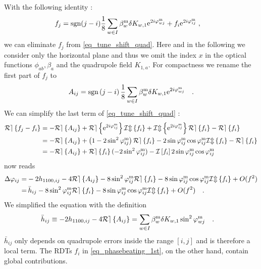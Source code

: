  With the following identity \cite{Tomas2005, Franchi2007}: 
\begin{align}
  f_j &= \text{sgn}(j-i) \frac{1}{8}\sum\limits_{w\in I}\beta_w ^\text{m} \delta K_{w,1}
  \text{e}^{2i\varphi_{wj}^\text{m}}+f_{i}\text{e}^{2i\varphi_{ij}^\text{m}}\; ,
  \label{eq_rogelio_fjfromfi} 
\end{align}
we can eliminate $f_j$ from \eqref{eq_tune_shift_quad}.
Here and in the following we consider only the horizontal plane and thus we omit the index $x$ in the optical
functions $\phi_{ab}, \beta_a$ and the quadrupole field $K_{1,a}$.
For compactness we rename the first part of $f_j$ to
\begin{equation}
  A_{ij} = \text{sgn} \left( j-i \right) \frac{1}{8} \sum\limits_{w \in I} \beta_w^\text{m} \delta
  K_{w,1} \text{e}^{2i\varphi_{wj}^\text{m}}
  \quad .
  \label{eq_Aij}
\end{equation}
We can simplify the last term of \eqref{eq_tune_shift_quad} \cite{Franchi2014}:
\begin{align}
  \label{eq_simplify_Re(f)}
  \mathcal{Re} \left\{ f_j-f_i \right\} &= 
  -\mathcal{Re} \left\{ A_{ij} \right\} + \mathcal{Re} \left\{ \text{e}^{2i\varphi_{ij}^\text{m}} \right\}\mathcal{Im} \left\{ f_i \right\} + \mathcal{Im} \left\{ \text{e}^{2i\varphi_{ij}^\text{m}} \right\}\mathcal{Re} \left\{ f_i \right\} -
  \mathcal{Re} \left\{ f_i \right\} \notag \\ 
  &= -\mathcal{Re} \left\{ A_{ij} \right\} + \left( 1-2\sin^2\varphi_{ij}^\text{m} \right)\mathcal{Re} \left\{ f_i \right\} -
  2\sin\varphi_{ij}^\text{m} \cos\varphi_{ij}^\text{m} \mathcal{Im} \left\{ f_i \right\} - \mathcal{Re} \left\{ f_i \right\} \notag \\
  &= -\mathcal{Re} \left\{ A_{ij} \right\} + \mathcal{Re} \left\{ f_i \right\}(-2\sin^2\varphi_{ij}^\text{m}) - \mathcal{I}\left[f_i\right]2 \sin\varphi_{ij}^\text{m}\cos\varphi_{ij}^\text{m}
\end{align}
 now reads
\begin{align}
  \Delta\varphi_{ij} =& -2h_{1100,ij} - 4\mathcal{Re} \left\{ A_{ij} \right\} - 8 \sin^2\varphi_{ij}^\text{m}\mathcal{Re} \left\{ f_i \right\}
- 8\sin\varphi_{ij}^\text{m} \cos\varphi_{ij}^\text{m}\mathcal{Im} \left\{ f_i \right\}+O(f^2) \notag \\
=&\, \bar{h}_{ij} - 8 \sin^2\varphi_{ij}^\text{m}\mathcal{Re} \left\{ f_i \right\} - 8\sin\varphi_{ij}^\text{m} \cos\varphi_{ij}^\text{m}\mathcal{Im} \left\{ f_i \right\} 
 +O(f^2)
\quad .
\label{eq_phasebeating_1st_app}
\end{align}
We simplified the equation with the definition
\begin{align}
  \bar{h}_{ij} &\equiv -2h_{1100,ij} - 4\mathcal{Re} \left\{ A_{ij} \right\} 
= \sum\limits_{w \in I}\beta_w^\text{m} \delta K_{w,1}\sin ^ 2 \varphi_{wj}^\text{m}\quad .
\label{eq_hbar_app}
\end{align}
$\bar{h}_{ij}$ only depends on quadrupole errors inside the range $[i,j]$ and is therefore a local
term. The RDTs $f_i$ in \eqref{eq_phasebeating_1st}, on the other hand, contain global contributions.



